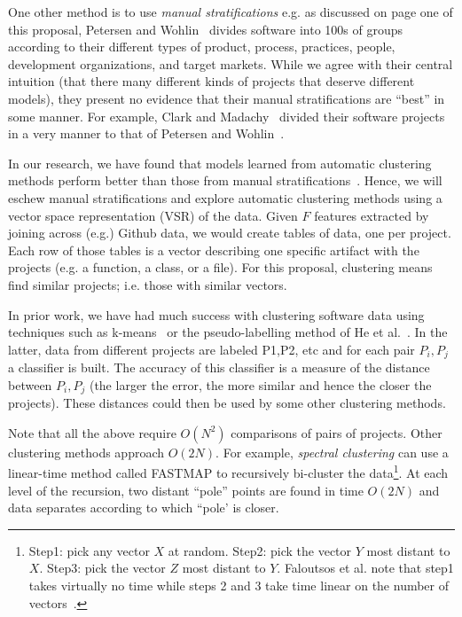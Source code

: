 One other method  is to use 
{\em manual stratifications} e.g. as discussed on page one of this proposal,
Petersen and Wohlin~\cite{Petersen2009} divides software into 100s of groups according to their different types of product, process, practices, people, development organizations, and target markets. While we agree
with their central intuition (that there many different kinds of projects that deserve different models), they present no evidence that their manual stratifications are ``best'' in some manner.
For example, 
Clark and Madachy~\cite{clark15} divided their software projects in a very manner to
that of  Petersen and Wohlin~\cite{Petersen2009}.

In our research, we have found that models learned from automatic clustering methods
perform better than those from manual stratifications~\cite{me06a,Menzies2012}.
Hence, we will eschew manual stratifications and explore automatic clustering methods
using a vector space representation (VSR) of the data.
Given $F$ features extracted by joining across (e.g.) Github data, we would create tables of data, one per project. Each row of those tables is a vector describing  one specific artifact with the projects (e.g. a function, a class, or a file). For this proposal, clustering means find similar projects; i.e. those with similar vectors.


In prior work,
we have had much success with
   clustering software data using techniques 
such as k-means~\cite{majumder18} or 
 the pseudo-labelling method of He et al.~\cite{he2013learning}.  In the latter, data from different projects are labeled P1,P2, etc and for each pair $P_i,P_j$ a classifier is built.
The accuracy of this classifier is a measure of the distance between  $P_i,P_j$  (the larger
the error, the more similar and hence the closer the projects).   These distances could then be used by some other clustering methods. 

Note that all the above require $O(N^2)$ comparisons of pairs of projects.
Other clustering methods approach $O(2N)$. For example,
  {\em spectral clustering}  can use a linear-time method called FASTMAP to recursively bi-cluster the data\footnote{Step1: pick any vector $X$ at random.
  Step2: pick the vector $Y$ most distant to $X$. Step3: pick
  the vector $Z$ most distant to $Y$.
  Faloutsos et al. note that step1 takes virtually no time while
  steps 2 and 3 take 
  time linear on the number of vectors~\cite{faloutsos1995fastmap}.}.
  At each level of the recursion, two distant ``pole'' points are found in time $O(2N)$ and data separates according to which ``pole' is closer.
  
